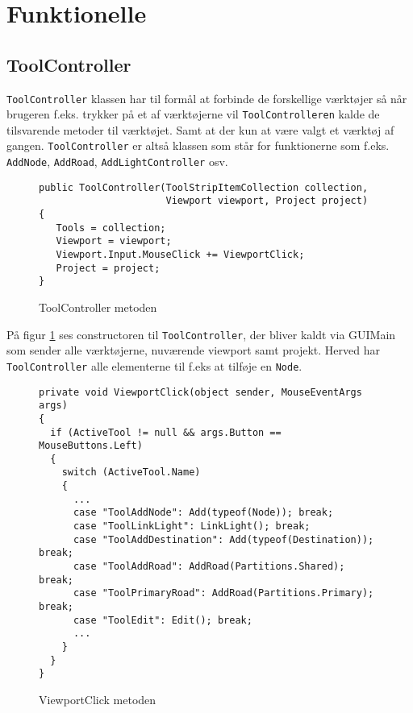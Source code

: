 \section{Funktionelle}\label{Funktionelle}
\subsection{ToolController}
\texttt{ToolController} klassen har til formål at forbinde de forskellige værktøjer så når brugeren f.eks. trykker på et af værktøjerne vil \texttt{ToolControlleren} kalde de tilsvarende metoder til værktøjet. Samt at der kun at være valgt et værktøj af gangen. \texttt{ToolController} er altså klassen som står for funktionerne som f.eks. \texttt{AddNode}, \texttt{AddRoad}, \texttt{AddLightController} osv.

\begin{figure}[H]
\begin{lstlisting}
public ToolController(ToolStripItemCollection collection, 
                      Viewport viewport, Project project)
{
   Tools = collection;
   Viewport = viewport;
   Viewport.Input.MouseClick += ViewportClick;
   Project = project;
}
\end{lstlisting}
\caption{ToolController metoden}\label{ToolControllerCode}
\end{figure}

På figur \ref{ToolControllerCode} ses constructoren til \texttt{ToolController}, der bliver kaldt via GUIMain som sender alle værktøjerne, nuværende viewport samt projekt. Herved har \texttt{ToolController} alle elementerne til f.eks at tilføje en \texttt{Node}.

\begin{figure}[H]
\begin{lstlisting}
private void ViewportClick(object sender, MouseEventArgs args)
{
  if (ActiveTool != null && args.Button == MouseButtons.Left)
  {
    switch (ActiveTool.Name)
    {
      ...
      case "ToolAddNode": Add(typeof(Node)); break;
      case "ToolLinkLight": LinkLight(); break;
      case "ToolAddDestination": Add(typeof(Destination)); break;
      case "ToolAddRoad": AddRoad(Partitions.Shared); break;
      case "ToolPrimaryRoad": AddRoad(Partitions.Primary); break;
      case "ToolEdit": Edit(); break;
      ...
    }
  }
}
\end{lstlisting}
\caption{ViewportClick metoden}\label{ViewportClickCode}
\end{figure}


